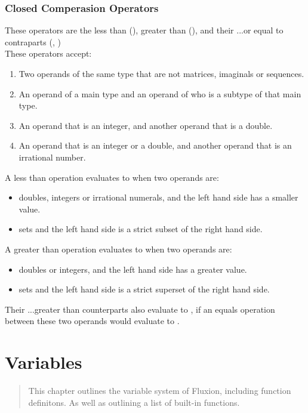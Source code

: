 \documentclass[11pt,a4paper]{book}
\begin{document}
\subsection{Closed Comperasion Operators}

These operators are the less than (\code{<}), greater than (\code{>}), and their ...or equal to contraparts (\code{<=}, \code{>=}) \\

These operators accept:

\begin{enumerate}
\item Two operands of the same type that are not matrices, imaginals or sequences.
\item An operand of a main type and an operand of who is a subtype of that main type.
\item An operand that is an integer, and another operand that is a double.
\item An operand that is an integer or a double, and another operand that is an irrational number.
\end{enumerate}

A less than operation evaluates to  when two operands are:

\begin{itemize}
\item doubles, integers or irrational numerals, and the left hand side has a smaller value.
\item sets and the left hand side is a strict subset of the right hand side.
\end{itemize}

A greater than operation evaluates to  when two operands are:

\begin{itemize}
\item doubles or integers, and the left hand side has a greater value.
\item sets and the left hand side is a strict superset of the right hand side.
\end{itemize}

Their ...greater than counterparts also evaluate to , if an equals operation between these two operands would evaluate to .


\chapter{Variables}

\vspace{1em}
\begin{quotation}
This chapter outlines the variable system of Fluxion, including function definitons. As well as outlining a list of built-in functions.
\end{quotation}
\newpage
\end{document}
